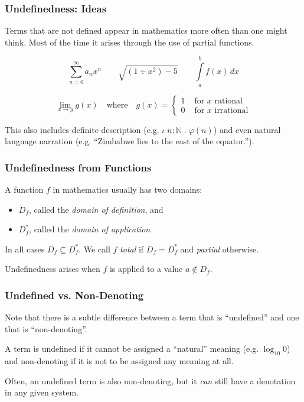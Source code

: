 \documentclass[aspectratio=169, usenames, dvipsnames]{beamer}
\begin{document}
\begin{frame}
\frametitle{Undefinedness: Ideas}
Terms that are not defined appear in mathematics more often than one might think. Most of the time it arises through the use of partial functions.

$$ \sum\limits_{n=0}^{\infty} a_n x^n \qquad \sqrt{(1 \div {x^2}) - 5} \qquad \int\limits_{a}^{b} f(x)\, dx$$

$$\lim_{x \to y} g(x) \quad \text{where} \quad g(x) = \begin{cases}
1 & \text{ for } x \text{ rational}\\
0 & \text{ for } x \text{ irrational}
\end{cases}$$
\medskip

This also includes definite description (e.g. $\iota\;n : \mathbb{N}\;.\; \varphi(n)$) and even natural language narration (e.g. ``Zimbabwe lies to the east of the equator.'').  
\end{frame}

\begin{frame}
\frametitle{Undefinedness from Functions}

A function $f$ in mathematics usually has two domains:
\medskip

\begin{itemize}
\item $D_f$, called the \emph{domain of definition}, and
\item $D_f^*$, called the \emph{domain of application}
\end{itemize}
\medskip

In all cases $D_f \subseteq D_f^*$. We call $f$ \emph{total} if $D_f = D_f^*$ and \emph{partial} otherwise.
\bigskip\bigskip

Undefinedness arises when $f$ is applied to a value $a \notin D_f$. 
\end{frame}

\begin{frame}
\frametitle{Undefined vs. Non-Denoting}

Note that there is a subtle difference between a term that is ``undefined'' and one that is ``non-denoting''.\bigskip

A term is undefined if it cannot be assigned a ``natural'' meaning (e.g. $\log_{10} 0$) and non-denoting if it is not to be assigned any meaning at all.
\medskip

Often, an undefined term is also non-denoting, but it \emph{can} still have a denotation in any given system.
\end{frame}
\end{document}
